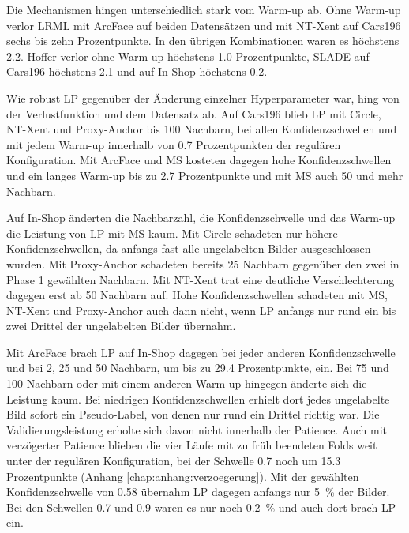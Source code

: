 Die Mechanismen hingen unterschiedlich stark vom Warm-up ab. Ohne Warm-up verlor \ac{LRML} mit ArcFace auf beiden Datensätzen und mit \ac{NT-Xent} auf Cars196 sechs bis zehn Prozentpunkte. In den übrigen Kombinationen waren es höchstens \num{2.2}. Hoffer verlor ohne Warm-up höchstens \num{1.0} Prozentpunkte, \ac{SLADE} auf Cars196 höchstens \num{2.1} und auf In-Shop höchstens \num{0.2}.

Wie robust \ac{LP} gegenüber der Änderung einzelner Hyperparameter war, hing von der Verlustfunktion und dem Datensatz ab. Auf Cars196 blieb \ac{LP} mit Circle, \ac{NT-Xent} und Proxy-Anchor bis 100 Nachbarn, bei allen Konfidenzschwellen und mit jedem Warm-up innerhalb von \num{0.7} Prozentpunkten der regulären Konfiguration. Mit ArcFace und \ac{MS} kosteten dagegen hohe Konfidenzschwellen und ein langes Warm-up bis zu \num{2.7} Prozentpunkte und mit \ac{MS} auch 50 und mehr Nachbarn.

Auf In-Shop änderten die Nachbarzahl, die Konfidenzschwelle und das Warm-up die Leistung von \ac{LP} mit \ac{MS} kaum. Mit Circle schadeten nur höhere Konfidenzschwellen, da anfangs fast alle ungelabelten Bilder ausgeschlossen wurden. Mit Proxy-Anchor schadeten bereits 25 Nachbarn gegenüber den zwei in Phase 1 gewählten Nachbarn. Mit \ac{NT-Xent} trat eine deutliche Verschlechterung dagegen erst ab 50 Nachbarn auf. Hohe Konfidenzschwellen schadeten mit \ac{MS}, \ac{NT-Xent} und Proxy-Anchor auch dann nicht, wenn \ac{LP} anfangs nur rund ein bis zwei Drittel der ungelabelten Bilder übernahm. 

Mit ArcFace brach \ac{LP} auf In-Shop dagegen bei jeder anderen Konfidenzschwelle und bei 2, 25 und 50 Nachbarn, um bis zu \num{29.4} Prozentpunkte, ein. Bei 75 und 100 Nachbarn oder mit einem anderen Warm-up hingegen änderte sich die Leistung kaum. Bei niedrigen Konfidenzschwellen erhielt dort jedes ungelabelte Bild sofort ein Pseudo-Label, von denen nur rund ein Drittel richtig war. Die Validierungsleistung erholte sich davon nicht innerhalb der Patience. Auch mit verzögerter Patience blieben die vier Läufe mit zu früh beendeten Folds weit unter der regulären Konfiguration, bei der Schwelle \num{0.7} noch um \num{15.3} Prozentpunkte (Anhang \ref{chap:anhang:verzoegerung}). Mit der gewählten Konfidenzschwelle von \num{0.58} übernahm \ac{LP} dagegen anfangs nur \qty{5}{\percent} der Bilder. Bei den Schwellen \num{0.7} und \num{0.9} waren es nur noch \qty{0.2}{\percent} und auch dort brach \ac{LP} ein.


